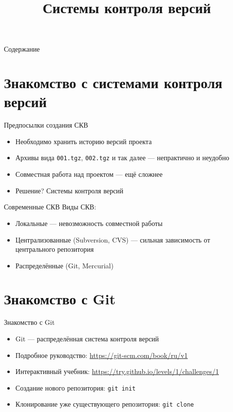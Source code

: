 \documentclass[handout]{beamer}
\title{Системы контроля версий}
\date{}
\begin{document}
\begin{frame}
	\maketitle
\end{frame}

\begin{frame}{Содержание}
	\tableofcontents
\end{frame}

\section{Знакомство с системами контроля версий}

\begin{frame}{Предпосылки создания СКВ}
	\begin{itemize}
		\item{Необходимо хранить историю версий проекта}\pause
		\item{Архивы вида \texttt{001.tgz}, \texttt{002.tgz} и так далее --- непрактично и неудобно}\pause
		\item{Совместная работа над проектом --- ещё сложнее}\pause
		\item{Решение? Системы контроля версий}
	\end{itemize}	
\end{frame}

\begin{frame}{Современные СКВ}
	Виды СКВ:\pause
	\begin{itemize}
		\item{Локальные --- невозможность совместной работы}\pause
		\item{Централизованные (Subversion, CVS) --- сильная зависимость от центрального репозитория}\pause
		\item{Распределённые (Git, Mercurial)}
	\end{itemize}
\end{frame}

\section{Знакомство с Git}

\begin{frame}{Знакомство с Git}
	\begin{itemize}
		\item{Git --- распределённая система контроля версий}\pause
		\item{Подробное руководство: {\color{blue} \url{https://git-scm.com/book/ru/v1}}}\pause
		\item{Интерактивный учебник: {\color{blue}\url{https://try.github.io/levels/1/challenges/1}}}\pause
		\item{Создание нового репозитория: \texttt{git~init}}\pause
		\item{Клонирование уже существующего репозитория: \texttt{git~clone}}
	\end{itemize}
\end{frame}
\end{document}

